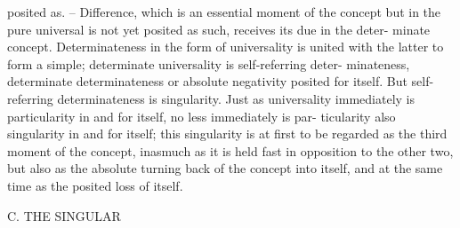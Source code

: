 posited as. – Difference, which is an essential moment of the concept but
in the pure universal is not yet posited as such, receives its due in the deter-
minate concept. Determinateness in the form of universality is united with
the latter to form a simple; determinate universality is self-referring deter-
minateness, determinate determinateness or absolute negativity posited for
itself. But self-referring determinateness is singularity. Just as universality
immediately is particularity in and for itself, no less immediately is par-
ticularity also singularity in and for itself; this singularity is at first to be
regarded as the third moment of the concept, inasmuch as it is held fast
in opposition to the other two, but also as the absolute turning back of the
concept into itself, and at the same time as the posited loss of itself.

C. THE SINGULAR

